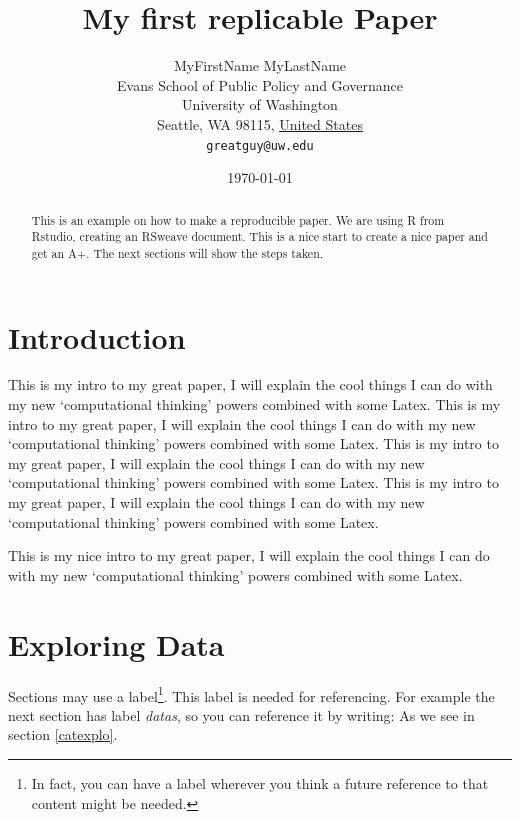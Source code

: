 \documentclass[11pt]{article}
\title{My first replicable Paper}
\author{
        MyFirstName MyLastName\\
        Evans School of Public Policy and Governance\\
        University of Washington\\
        Seattle, WA 98115, \underline{United States}\\
        \texttt{greatguy@uw.edu}
}
\date{\today}
\begin{document}


\maketitle %


\begin{abstract}
This is an example on how to make a reproducible paper. We are using R from Rstudio, creating an RSweave document. This is a nice start to create a nice paper and get an A+. The next sections will show the steps taken.
\end{abstract}

\section{Introduction}\label{intro}  %

This is my intro to my great paper, I will explain the cool things I can do with my new `computational thinking' powers combined with some Latex. This is my intro to my great paper, I will explain the cool things I can do with my new `computational thinking' powers combined with some Latex. This is my intro to my great paper, I will explain the cool things I can do with my new `computational thinking' powers combined with some Latex. This is my intro to my great paper, I will explain the cool things I can do with my new `computational thinking' powers combined with some Latex.

This is my nice intro to my great paper, 
I will explain the cool things 
I can do with my new `computational thinking' 
powers
combined with some Latex.


\section{Exploring Data}\label{explo}

Sections may use a label\footnote{In fact, you can have a label wherever you think a future reference to that content might be needed.}. This label is needed for referencing. For example the next section has label \emph{datas}, so you can reference it by writing: As we see in section \ref{catexplo}.
\end{document}
